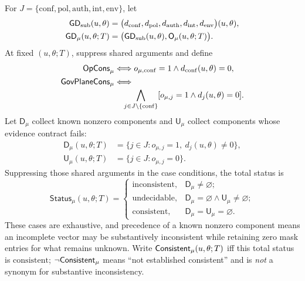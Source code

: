 \begin{definition}
\label{def:gd}
For $J=\{\mathrm{conf},\mathrm{pol},\mathrm{auth},\mathrm{int},
\mathrm{env}\}$, let
\[
\begin{aligned}
\mathsf{GD}_{\mathrm{sub}}(u,\theta)&=\bigl(d_{\mathrm{conf}},d_{\mathrm{pol}},d_{\mathrm{auth}},d_{\mathrm{int}},d_{\mathrm{env}}\bigr)(u,\theta),\\
\mathsf{GD}_{\mu}(u,\theta;T)&=
 \bigl(\mathsf{GD}_{\mathrm{sub}}(u,\theta),\mathsf{O}_{\mu}(u,\theta;T)\bigr).
\end{aligned}
\]
At fixed $(u,\theta;T)$, suppress shared arguments and define
\[
\begin{aligned}
\mathsf{OpCons}_{\mu}&\Longleftrightarrow
 o_{\mu,\mathrm{conf}}=1\land d_{\mathrm{conf}}(u,\theta)=0,\\
\mathsf{GovPlaneCons}_{\mu}&\Longleftrightarrow\\[-2pt]
&\quad\bigwedge_{j\in J\setminus\{\mathrm{conf}\}}
 [o_{\mu,j}=1\land d_j(u,\theta)=0].
\end{aligned}
\]
Let $\mathsf D_{\mu}$ collect known nonzero components and
$\mathsf U_{\mu}$ collect components whose evidence contract fails:
\[
\begin{aligned}
\mathsf D_{\mu}(u,\theta;T)&=
 \{j\in J:o_{\mu,j}=1,\ d_j(u,\theta)\neq0\},\\
\mathsf U_{\mu}(u,\theta;T)&=\{j\in J:o_{\mu,j}=0\}.
\end{aligned}
\]
Suppressing those shared arguments in the case conditions, the total status is
\[
\mathsf{Status}_{\mu}(u,\theta;T)=
\begin{cases}
\mathrm{inconsistent},&\mathsf D_{\mu}\neq\varnothing;\\
\mathrm{undecidable},&\mathsf D_{\mu}=\varnothing\land
 \mathsf U_{\mu}\neq\varnothing;\\
\mathrm{consistent},&\mathsf D_{\mu}=\mathsf U_{\mu}=\varnothing.
\end{cases}
\]
These cases are exhaustive, and precedence of a known nonzero component
means an incomplete vector may be substantively inconsistent while retaining
zero mask entries for what remains unknown. Write
$\mathsf{Consistent}_{\mu}(u,\theta;T)$ iff this total status is
$\mathrm{consistent}$; $\neg\mathsf{Consistent}_{\mu}$ means ``not established
consistent'' and is \emph{not} a synonym for substantive inconsistency.


\end{definition}
